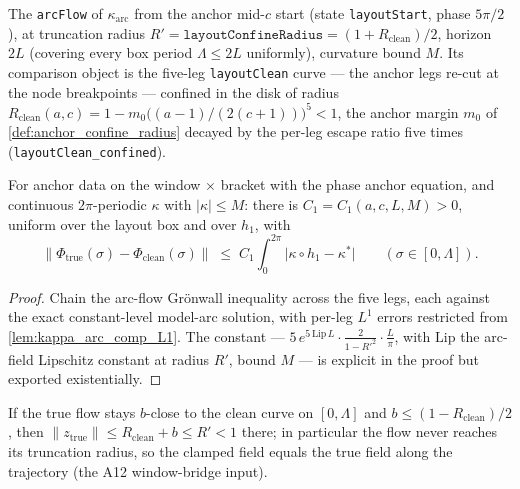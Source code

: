 \begin{definition}
  \label{def:layout_flow}
  The \texttt{arcFlow} of $\kappa_{\mathrm{arc}}$ from the anchor mid-$c$
  start (state \texttt{layoutStart}, phase $5\pi/2$), at truncation radius
  $R'=\texttt{layoutConfineRadius}=(1+R_{\mathrm{clean}})/2$, horizon $2L$
  (covering every box period $\Lambda\le2L$ uniformly), curvature bound $M$.
  Its comparison object is the five-leg \texttt{layoutClean} curve — the
  anchor legs re-cut at the node breakpoints — confined in the disk of radius
  $R_{\mathrm{clean}}(a,c)=1-m_0\bigl((a-1)/(2(c+1))\bigr)^5<1$, the anchor
  margin $m_0$ of \cref{def:anchor_confine_radius} decayed by the per-leg
  escape ratio five times (\texttt{layoutClean\_confined}).
\end{definition}

\begin{lemma}
  \label{lem:layout_trajectory_close}
  For anchor data on the window $\times$ bracket with the phase anchor
  equation, and continuous $2\pi$-periodic $\kappa$ with $|\kappa|\le M$:
  there is $C_1=C_1(a,c,L,M)>0$, uniform over the layout box and over $h_1$,
  with
  \[
    \bigl\|\Phi_{\mathrm{true}}(\sigma)-\Phi_{\mathrm{clean}}(\sigma)\bigr\|
    \;\le\;C_1\int_0^{2\pi}\bigl|\kappa\circ h_1-\kappa^*\bigr|
    \qquad(\sigma\in[0,\Lambda]).
  \]
\end{lemma}

\begin{proof}
  \leanok
  Chain the arc-flow Grönwall inequality across the five legs, each against
  the exact constant-level model-arc solution, with per-leg $L^1$ errors
  restricted from \cref{lem:kappa_arc_comp_L1}.  The constant —
  $5\,e^{5\,\mathrm{Lip}\,L}\cdot\frac2{1-R'^2}\cdot\frac L\pi$, with
  $\mathrm{Lip}$ the arc-field Lipschitz constant at radius $R'$, bound $M$
  — is explicit in the proof but exported existentially.
\end{proof}

\begin{lemma}
  \label{lem:layout_flow_confined}
  If the true flow stays $b$-close to the clean curve on $[0,\Lambda]$ and
  $b\le(1-R_{\mathrm{clean}})/2$, then
  $\|z_{\mathrm{true}}\|\le R_{\mathrm{clean}}+b\le R'<1$ there; in
  particular the flow never reaches its truncation radius, so the clamped
  field equals the true field along the trajectory (the A12 window-bridge
  input).
\end{lemma}

